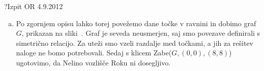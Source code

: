\begin{naloga}{?}{Izpit OR 4.9.2012}
\begin{odgovor}
\begin{enumerate}[(a)]
\item Po zgornjem opisu lahko torej povežemo dane točke v ravnini in dobimo graf $G$, prikazan na sliki~\fig. 
Graf je seveda neusmerjen, saj smo povezave definirali s simetrično relacijo.
Za uteži smo vzeli razdalje med točkami, a jih za rešitev naloge ne bomo potrebovali.
Sedaj s klicem {\sc Zabe}($G, (0,0), (8,8)$) ugotovimo, da Nelino vozlišče Roku ni dosegljivo.
\begin{slika}
\pgfslika
{}
\end{slika}

\end{enumerate}
\end{odgovor}
\end{naloga}
